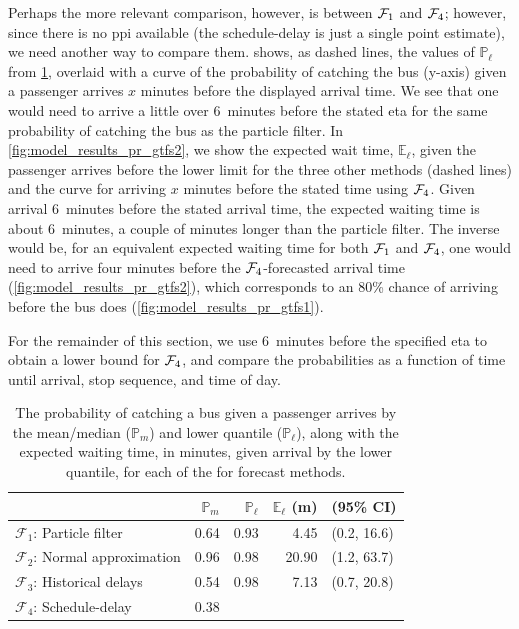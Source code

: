 Perhaps the more relevant comparison, however, is between $\mathcal{F}_1$ and $\mathcal{F}_4$; however, since there is no \gls{ppi} available (the schedule-delay is just a single point estimate), we need another way to compare them.  shows, as dashed lines, the values of $\mathbb{P}_\ell$ from \cref{tab:model_results_pr_miss}, overlaid with a curve of the probability of catching the bus (y-axis) given a passenger arrives $x$ minutes before the displayed arrival time. We see that one would need to arrive a little over 6~minutes before the stated \gls{eta} for the same probability of catching the bus as the particle filter. In \cref{fig:model_results_pr_gtfs2}, we show the expected wait time, $\mathbb{E}_\ell$, given the passenger arrives before the lower limit for the three other methods (dashed lines) and the curve for arriving $x$ minutes before the stated time using $\mathcal{F}_4$. Given arrival 6~minutes before the stated arrival time, the expected waiting time is about 6~minutes, a couple of minutes longer than the particle filter. The inverse would be, for an equivalent expected waiting time for both $\mathcal{F}_1$ and $\mathcal{F}_4$, one would need to arrive four minutes before the $\mathcal{F}_4$-forecasted arrival time (\cref{fig:model_results_pr_gtfs2}), which corresponds to an 80\% chance of arriving before the bus does (\cref{fig:model_results_pr_gtfs1}).


For the remainder of this section, we use 6~minutes before the specified \gls{eta} to obtain a lower bound for $\mathcal{F}_4$, and compare the probabilities as a function of time until arrival, stop sequence, and time of day.



\begin{knitrout}
\color{fgcolor}\begin{table}

\caption{\label{tab:model_results_pr_miss}The probability of catching a bus given a passenger arrives by the mean/median ($\mathbb{P}_m$) and lower quantile ($\mathbb{P}_\ell$), along with the expected waiting time, in minutes, given arrival by the lower quantile, for each of the for forecast methods.}
\centering
\begin{tabular}[t]{lrrrl}
\toprule
  & $\mathbb{P}_m$ & $\mathbb{P}_\ell$ & $\mathbb{E}_\ell$ (m) & (95\% CI)\\
\midrule
$\mathcal{F}_1$: Particle filter & 0.64 & 0.93 & 4.45 & (0.2, 16.6)\\
$\mathcal{F}_2$: Normal approximation & 0.96 & 0.98 & 20.90 & (1.2, 63.7)\\
$\mathcal{F}_3$: Historical delays & 0.54 & 0.98 & 7.13 & (0.7, 20.8)\\
$\mathcal{F}_4$: Schedule-delay & 0.38 &  &  & \\
\bottomrule
\end{tabular}
\end{table}


\end{knitrout}

